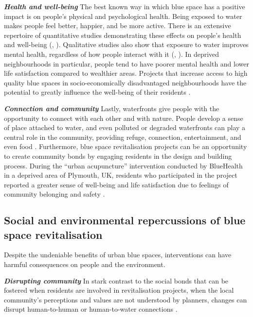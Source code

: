 \documentclass{article}
\newcommand{\bisection}[1]{\textbf{\textit{#1}}}
\begin{document}
\bisection{Health and well-being}
The best known way in which blue space has a positive impact is on people's physical and psychological health. Being exposed to water makes people feel better, happier, and be more active. 
There is an extensive repertoire of quantitative studies demonstrating these effects on people's health and well-being (\cite{gascon2017outdoor}, \cite{britton2020blue}).
Qualitative studies also show that exposure to water improves mental health, regardless of how people interact with it (\cite{garrett2019urban}, \cite{van2021urban}). %
In deprived neighbourhoods in particular, people tend to have poorer mental health and lower life satisfaction compared to wealthier areas. Projects that increase access to high quality blue spaces in socio-economically disadvantaged neighbourhoods have the potential to greatly influence the well-being of their residents \parencite{van2021urban}.

\bisection{Connection and community}
Lastly, waterfronts give people with the opportunity to connect with each other and with nature. People develop a sense of place attached to water, and even polluted or degraded waterfronts can play a central role in the community, providing refuge, connection, entertainment, and even food \parencite{toomey2021place}. 
Furthermore, blue space revitalisation projects can be an opportunity to create community bonds by engaging residents in the design and building process. During the ``urban acupuncture'' intervention conducted by BlueHealth in a deprived area of Plymouth, UK, residents who participated in the project reported a greater sense of well-being and life satisfaction due to feelings of community belonging and safety \parencite{van2021urban}.



\subsection{Social and environmental repercussions of blue space revitalisation}

Despite the undeniable benefits of urban blue spaces, interventions can have harmful consequences on people and the environment.

\bisection{Disrupting community} In stark contrast to the social bonds that can be fostered when residents are involved in revitalisation projects, when the local community's perceptions and values are not understood by planners, changes can disrupt human-to-human or human-to-water connections \parencite{toomey2021place}. 
\end{document}

